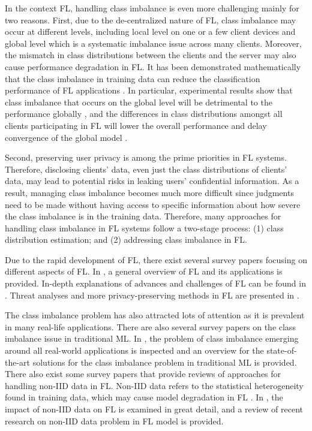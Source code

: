 \documentclass[10pt,journal,compsoc]{IEEEtran}
\begin{document}
In the context FL, handling class imbalance is even more challenging mainly for two reasons. First, due to the de-centralized nature of FL, class imbalance may occur at different levels, including local level on one or a few client devices and global level which is a systematic imbalance issue across many clients. Moreover, the mismatch in class distributions between the clients and the server may also cause performance degradation in FL. It has been demonstrated mathematically that the class imbalance in training data can reduce the classification performance of FL applications \cite{duan2019astraea}. In particular, experimental results show that class imbalance that occurs on the global level will be detrimental to the performance globally \cite{xiao2021experimental} \cite{chou2022grp}, and the differences in class distributions amongst all clients participating in FL will lower the overall performance and delay convergence of the global model \cite{sittijuk2021performance} \cite{diwangkara2020study}. 

Second, preserving user privacy is among the prime priorities in FL systems. Therefore, disclosing clients' data, even just the class distributions of clients' data, may lead to potential risks in leaking users' confidential information. As a result, managing class imbalance becomes much more difficult since judgments need to be made without having access to specific information about how severe the class imbalance is in the training data. Therefore, many approaches for handling class imbalance in FL systems follow a two-stage process: (1) class distribution estimation; and (2) addressing class imbalance in FL. 

Due to the rapid development of FL, there exist several survey papers focusing on different aspects of FL. In \cite{zhang2021survey} \cite{yang2019federated}, a general overview of FL and its applications is provided. In-depth explanations of advances and challenges of FL can be found in \cite{kairouz2021advances} \cite{khan2021federated}. Threat analyses and more privacy-preserving methods in FL are presented in \cite{yin2021comprehensive} \cite{mothukuri2021survey}. 

The class imbalance problem has also attracted lots of attention as it is prevalent in many real-life applications. There are also several survey papers on the class imbalance issue in traditional ML. In \cite{kaur2019systematic} \cite{haixiang2017learning} , the problem of class imbalance emerging around all real-world applications is inspected and an overview for the state-of-the-art solutions for the class imbalance problem in traditional ML is provided. There also exist some survey papers that provide reviews of approaches for handling non-IID data in FL. Non-IID data refers to the statistical heterogeneity found in training data, which may cause model degradation in FL \cite{zhao2018federated}. In \cite{zhu2021federated}, the impact of non-IID data on FL is examined in great detail, and a review of recent research on non-IID data problem in FL model is provided. 
\end{document}
